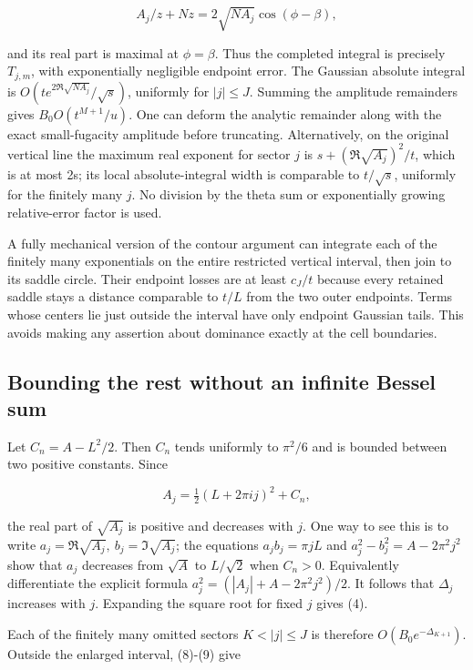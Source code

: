 \documentclass[11pt,letterpaper]{article}
\begin{document}
\[
 A_j/z+Nz=2\sqrt{NA_j}\cos(\phi-\beta),
\]

and its real part is maximal at \(\phi=\beta\). Thus the completed
integral is precisely \(T_{j,m}\), with exponentially negligible
endpoint error. The Gaussian absolute integral is
\(O(te^{2\Re\sqrt{NA_j}}/\sqrt s)\), uniformly for \(|j|\le J\). Summing
the amplitude remainders gives \(B_0O(t^{M+1}/u)\). One can deform the
analytic remainder along with the exact small-fugacity amplitude before
truncating. Alternatively, on the original vertical line the maximum
real exponent for sector \(j\) is \(s+(\Re\sqrt{A_j})^2/t\), which is at
most 2s; its local absolute-integral width is comparable to
\(t/\sqrt s\), uniformly for the finitely many \(j\). No division by the
theta sum or exponentially growing relative-error factor is used.

A fully mechanical version of the contour argument can integrate each of
the finitely many exponentials on the entire restricted vertical
interval, then join to its saddle circle. Their endpoint losses are at
least \(c_J/t\) because every retained saddle stays a distance
comparable to \(t/L\) from the two outer endpoints. Terms whose centers
lie just outside the interval have only endpoint Gaussian tails. This
avoids making any assertion about dominance exactly at the cell
boundaries.

\subsection{Bounding the rest without an infinite Bessel
sum}\label{mfp:bounding-the-rest-without-an-infinite-bessel-sum}

Let \(C_n=A-L^2/2\). Then \(C_n\) tends uniformly to \(\pi^2/6\) and is
bounded between two positive constants. Since

\[
 A_j=\tfrac12(L+2\pi ij)^2+C_n,
\]

the real part of \(\sqrt{A_j}\) is positive and decreases with
\textbar{}\(j\)\textbar. One way to see this is to write
\(a_j=\Re\sqrt{A_j},\ b_j=\Im\sqrt{A_j}\); the equations
\(a_jb_j=\pi jL\) and \(a_j^2-b_j^2=A-2\pi^2j^2\) show that \(a_j\)
decreases from \(\sqrt A\) to \(L/\sqrt2\) when \(C_n>0\). Equivalently
differentiate the explicit formula \(a_j^2=(|A_j|+A-2\pi^2j^2)/2\). It
follows that \(\Delta_j\) increases with \textbar{}\(j\)\textbar.
Expanding the square root for fixed \(j\) gives (4).

Each of the finitely many omitted sectors \(K<|j|\le J\) is therefore
\(O(B_0e^{-\Delta_{K+1}})\). Outside the enlarged interval, (8)-(9) give
\end{document}
